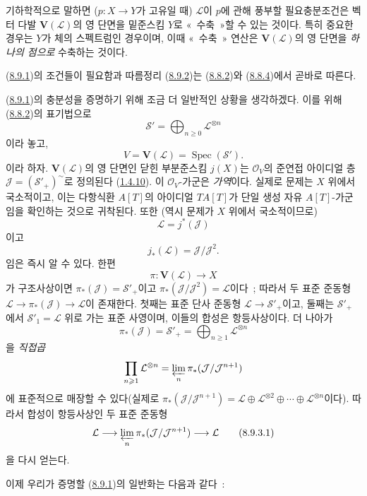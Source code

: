 기하학적으로 말하면 ($p:X\to Y$가 고유일 때) $\mathcal{L}$이 $p$에
관해 풍부할 필요충분조건은 벡터 다발 $\mathbf{V}(\mathcal{L})$의 영
단면을 밑준스킴 $Y$로 «~수축~»할 수 있는 것이다. 특히 중요한 경우는
$Y$가 체의 스펙트럼인 경우이며, 이때 «~수축~» 연산은
$\mathbf{V}(\mathcal{L})$의 영 단면을 \emph{하나의 점으로} 수축하는 것이다.

\begin{env}[8.9.3]
\label{II.8.9.3-ko}
(\hyperref[II.8.9.1-ko]{8.9.1})의 조건들이 필요함과 따름정리
(\hyperref[II.8.9.2-ko]{8.9.2})는
(\hyperref[II.8.8.2-ko]{8.8.2})와
(\hyperref[II.8.8.4-ko]{8.8.4})에서 곧바로 따른다.

(\hyperref[II.8.9.1-ko]{8.9.1})의 충분성을 증명하기 위해 조금 더
일반적인 상황을 생각하겠다. 이를 위해
(\hyperref[II.8.8.2-ko]{8.8.2})의 표기법으로
\[
  \mathcal{S}'=\bigoplus_{n\geqslant 0}\mathcal{L}^{\otimes n}
\]
이라 놓고,
\[
  V=\mathbf{V}(\mathcal{L})=\operatorname{Spec}(\mathcal{S}').
\]
이라 하자. $\mathbf{V}(\mathcal{L})$의 영 단면인 닫힌 부분준스킴
$j(X)$는 $\mathcal{O}_V$의 준연접 아이디얼 층
$\mathcal{J}=(\mathcal{S}'_+)^{\sim}$로 정의된다
(\hyperref[II.1.4.10-ko]{1.4.10}). 이 $\mathcal{O}_V$-가군은
\emph{가역}이다. 실제로 문제는 $X$ 위에서 국소적이고, 이는 다항식환
$A[T]$의 아이디얼 $TA[T]$가 단일 생성 자유 $A[T]$-가군임을 확인하는
것으로 귀착된다. 또한 (역시 문제가 $X$ 위에서 국소적이므로)
\[
  \mathcal{L}=j^*(\mathcal{J})
\]
이고
\[
  j_*(\mathcal{L})=\mathcal{J}/\mathcal{J}^2.
\]
임은 즉시 알 수 있다. 한편
\[
  \pi:\mathbf{V}(\mathcal{L})\longrightarrow X
\]
가 구조사상이면 $\pi_*(\mathcal{J})=\mathcal{S}'_+$이고
$\pi_*(\mathcal{J}/\mathcal{J}^2)=\mathcal{L}$이다~; 따라서 두 표준
준동형 $\mathcal{L}\to\pi_*(\mathcal{J})\to\mathcal{L}$이 존재한다.
첫째는 표준 단사 준동형 $\mathcal{L}\to\mathcal{S}'_+$이고, 둘째는
$\mathcal{S}'_+$에서 $\mathcal{S}'_1=\mathcal{L}$ 위로 가는 표준
사영이며, 이들의 합성은 항등사상이다. 더 나아가
\[
  \pi_*(\mathcal{J})=\mathcal{S}'_+
  =\bigoplus_{n\geqslant 1}\mathcal{L}^{\otimes n}
\]
을 \emph{직접곱}
\[
  \prod_{n\geqslant 1}\mathcal{L}^{\otimes n}
  =\varprojlim_n\pi_*(\mathcal{J}/\mathcal{J}^{n+1})
\]
에 표준적으로 매장할 수 있다(실제로
$\pi_*(\mathcal{J}/\mathcal{J}^{n+1})=
\mathcal{L}\oplus\mathcal{L}^{\otimes2}\oplus\cdots\oplus
\mathcal{L}^{\otimes n}$이다). 따라서 합성이 항등사상인 두 표준
준동형
\begin{equation}
\label{II.8.9.3.1-ko}
  \mathcal{L}\longrightarrow
  \varprojlim_n\pi_*(\mathcal{J}/\mathcal{J}^{n+1})
  \longrightarrow\mathcal{L}
\tag{8.9.3.1}
\end{equation}
을 다시 얻는다.

이제 우리가 증명할 (\hyperref[II.8.9.1-ko]{8.9.1})의 일반화는 다음과
같다~:
\end{env}

